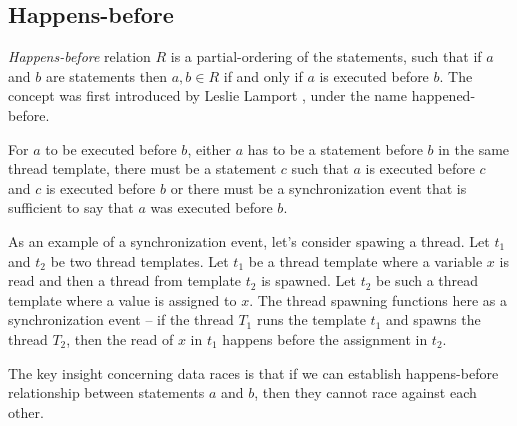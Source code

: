 \documentclass[..thesis.tex]{subfiles}
\begin{document}
\subsection{Happens-before}

\textit{Happens-before} relation $R$ is a partial-ordering of the statements, such that if $a$ and $b$ are statements then $a,b \in R$ if and only if $a$ is executed before $b$.
The concept was first introduced by Leslie Lamport \cite{lamport_time_1978}, under the name happened-before.

For $a$ to be executed before $b$, either $a$ has to be a statement before $b$ in the same thread template,
there must be a statement $c$ such that $a$ is executed before $c$ and $c$ is executed before $b$ or
there must be a synchronization event that is sufficient to say that $a$ was executed before $b$.

As an example of a synchronization event, let's consider spawing a thread. Let $t_1$ and $t_2$ be two thread templates.
Let $t_1$ be a thread template where a variable $x$ is read and then a thread from template $t_2$ is spawned.
Let $t_2$ be such a thread template where a value is assigned to $x$. The thread spawning functions here as a synchronization event -- 
if the thread $T_1$ runs the template $t_1$ and spawns the thread $T_2$, then the read of $x$ in $t_1$ happens before the assignment in $t_2$.

The key insight concerning data races is that if we can establish happens-before relationship between statements $a$ and $b$, then they cannot race against each other. 
\end{document}
